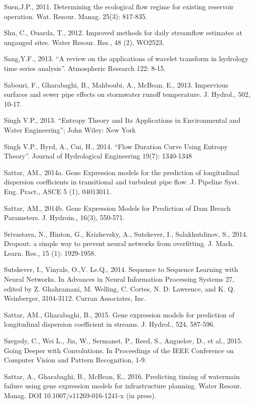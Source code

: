 \begin{hangingpar}{2em}
Suen,J.P., 2011. Determining the ecological flow regime for existing reservoir operation. Wat. Resour. Manag. 25(3): 817-835.

Shu, C., Ouarda, T., 2012. Improved methods for daily streamflow estimates at ungauged sites. Water Resour. Res., 48 (2), WO2523.

Sang,Y.F., 2013. ``A review on the applications of wavelet transform in hydrology time series analysis''. Atmospheric Research 122: 8-15.

Sabouri, F., Gharabaghi, B., Mahboubi, A., McBean, E., 2013.  Impervious surfaces and sewer pipe effects on stormwater runoff temperature.  J. Hydrol., 502, 10-17. 

Singh V.P., 2013. ``Entropy Theory and Its Applications in Environmental and Water Engineering''; John Wiley: New York

Singh V.P., Byrd, A., Cui, H., 2014. ``Flow Duration Curve Using Entropy Theory''. Journal of Hydrological Engineering 19(7): 1340-1348

Sattar, AM., 2014a. Gene Expression models for the prediction of longitudinal dispersion coefficients in transitional and turbulent pipe flow. J. Pipeline Syst. Eng. Pract., ASCE  5 (1), 04013011.

Sattar, AM., 2014b. Gene Expression Models for Prediction of Dam Breach Parameters. J. Hydroin., 16(3), 550-571.

Srivastava, N., Hinton, G., Krizhevsky, A., Sutskever, I., Salakhutdinov, S., 2014. Dropout: a simple way to prevent neural networks from overfitting. J. Mach. Learn. Res., 15 (1): 1929-1958.

Sutskever, I., Vinyals, O.,V. Le.Q., 2014. Sequence to Sequence Learning with Neural Networks. In Advances in Neural Information Processing Systems 27, edited by Z. Ghahramani, M. Welling, C. Cortes, N. D. Lawrence, and K. Q. Weinberger, 3104-3112. Curran Associates, Inc.

Sattar, AM., Gharabaghi, B., 2015. Gene expression models for prediction of longitudinal dispersion coefficient in streams. J. Hydrol., 524, 587-596.

Szegedy, C., Wei L., Jia, W.,  Sermanet, P., Reed, S.,  Anguelov, D., et al., 2015. Going Deeper with Convolutions. In Proceedings of the IEEE Conference on Computer Vision and Pattern Recognition, 1-9.

Sattar, A., Gharabaghi, B., McBean, E., 2016. Predicting timing of watermain failure using gene expression models for infrastructure planning. Water Resour. Manag. DOI 10.1007/s11269-016-1241-x (in press).


\end{hangingpar}
